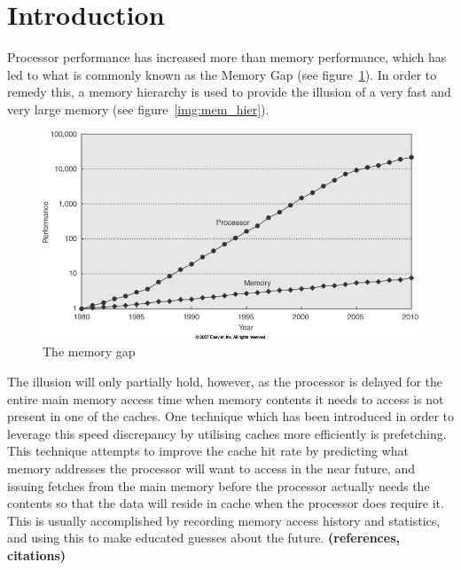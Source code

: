 
\section{Introduction}
\label{sec:introduction}
Processor performance has increased more than memory performance,
which has led to what is commonly known as the Memory Gap (see figure~\ref{img:mem_gap}). In order to remedy this, a memory
hierarchy is used to provide the illusion of a very fast and very
large memory (see figure~\ref{img:mem_hier}). 

\begin{figure}[H]
	\centering
	\includegraphics[scale=0.3]{./img/mem_gap}
	\caption{The memory gap}
	\label{img:mem_gap}
\end{figure}

The illusion will only partially hold, however, as the processor is
delayed for the entire main memory access time when memory contents it
needs to access is not present in one of the caches. One technique
which has been introduced in order to leverage this speed discrepancy
by utilising caches more efficiently is prefetching. This technique
attempts to improve the cache hit rate by predicting what memory
addresses the processor will want to access in the near future, and
issuing fetches from the main memory before the processor actually
needs the contents so that the data will reside in cache when the
processor does require it. This is usually accomplished by recording
memory access history and statistics, and using this to make educated
guesses about the future. 
{\bf (references, citations)}

